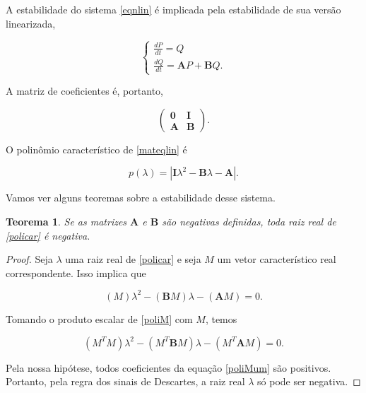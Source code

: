 \documentclass[
	12pt,				%
	openright,			%
	twoside,			%
	a4paper,			%
	english,			%
	french,				%
	spanish,			%
	brazil				%
	]{abntex2}
\newtheorem{teorema}{Teorema}[chapter]
\newcommand{\B}{\boldsymbol{B}}
\newcommand{\A}{\boldsymbol{A}}
\newcommand{\I}{\boldsymbol{I}}
\begin{document}
A estabilidade do sistema \ref{eqnlin} é implicada pela estabilidade de sua versão
linearizada,

\begin{equation} \label{eqlin}
	\begin{cases}
		\frac{dP}{dt} = Q \\
		\frac{dQ}{dt} = \textbf{A}P + \textbf{B}Q.
	\end{cases}
\end{equation}

A matriz de coeficientes é, portanto,

\begin{equation} \label{mateqlin}
	\begin{pmatrix}
		\boldsymbol{0} & \boldsymbol{I} \\
		\A & \B
	\end{pmatrix}.
\end{equation}

O polinômio característico de \ref{mateqlin} é

\begin{equation} \label{policar}
	p(\lambda) = |\I \lambda^2 - \B \lambda - \A|.
\end{equation}

Vamos ver alguns teoremas sobre a estabilidade desse sistema.

\begin{teorema} \label{teor}
	Se as matrizes $\A$ e $\B$ são negativas definidas, toda raiz real de \ref{policar}
	é negativa.
\end{teorema}

\begin{proof}
	Seja $\lambda$ uma raiz real de \ref{policar} e seja $M$ um vetor característico real correspondente.
	Isso implica que

	\begin{equation} \label{poliM}
		(M)\lambda^2 - (\B M)\lambda - (\A M) = 0.
	\end{equation}

	Tomando o produto escalar de \ref{poliM} com $M$, temos

	\begin{equation} \label{poliMum}
		(M^T M)\lambda^2 - (M^T \B M)\lambda - (M^T \A M) = 0.
	\end{equation}

	Pela nossa hipótese, todos coeficientes da equação \ref{poliMum} são positivos.
	Portanto, pela regra dos sinais de Descartes, a raiz real $\lambda$ só pode ser negativa.

\end{proof}
\end{document}
